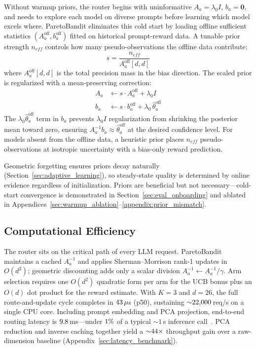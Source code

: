 Without warmup priors, the router begins with uninformative $A_a = \lambda_0 I$, $b_a = \mathbf{0}$, and needs to explore each model on diverse prompts before learning which model excels where. ParetoBandit eliminates this cold start by loading offline sufficient statistics $(A_a^{\mathrm{off}}, b_a^{\mathrm{off}})$ fitted on historical prompt-reward data. A tunable prior strength $n_\mathit{eff}$ controls how many pseudo-observations the offline data contribute:
\begin{equation}
    s = \frac{n_\mathit{eff}}{A_a^{\mathrm{off}}[d, d]}
    \label{eq:prior_scale}
\end{equation}
where $A_a^{\mathrm{off}}[d, d]$ is the total precision mass in the bias direction. The scaled prior is regularized with a mean-preserving correction:
\begin{align}
    A_a &\leftarrow s \cdot A_a^{\mathrm{off}} + \lambda_0 I
    \label{eq:prior_A} \\
    b_a &\leftarrow s \cdot b_a^{\mathrm{off}} + \lambda_0\, \hat\theta_a^{\mathrm{off}}
    \label{eq:prior_b}
\end{align}
The $\lambda_0 \hat\theta_a^{\mathrm{off}}$ term in $b_a$ prevents $\lambda_0 I$ regularization from shrinking the posterior mean toward zero, ensuring $A_a^{-1} b_a \approx \hat\theta_a^{\mathrm{off}}$ at the desired confidence level. For models absent from the offline data, a heuristic prior places $n_\mathit{eff}$ pseudo-observations at isotropic uncertainty with a bias-only reward prediction.

Geometric forgetting ensures priors decay naturally (Section~\ref{sec:adaptive_learning}), so steady-state quality is determined by online evidence regardless of initialization. Priors are beneficial but not necessary---cold-start convergence is demonstrated in Section~\ref{sec:eval_onboarding} and ablated in Appendices~\ref{sec:warmup_ablation}--\ref{appendix:prior_mismatch}.

\subsection{Computational Efficiency}
\label{sec:efficiency}

The router sits on the critical path of every LLM request. ParetoBandit maintains a cached $A_a^{-1}$ and applies Sherman--Morrison rank-1 updates in $O(d^2)$; geometric discounting adds only a scalar division $A_a^{-1} \leftarrow A_a^{-1}/\gamma$. Arm selection requires one $O(d^2)$ quadratic form per arm for the UCB bonus plus an $O(d)$ dot product for the reward estimate. With $K{=}3$ and $d{=}26$, the full route-and-update cycle completes in $43\,\mu$s (p50), sustaining ${\sim}22{,}000$\,req/s on a single CPU core. Including prompt embedding and PCA projection, end-to-end routing latency is $9.8$\,ms---under $1\%$ of a typical ${\sim}1$\,s inference call~\cite{ganglani2026llmlatency}. PCA reduction and inverse caching together yield a ${\sim}44{\times}$ throughput gain over a raw-dimension baseline (Appendix~\ref{sec:latency_benchmark}).

